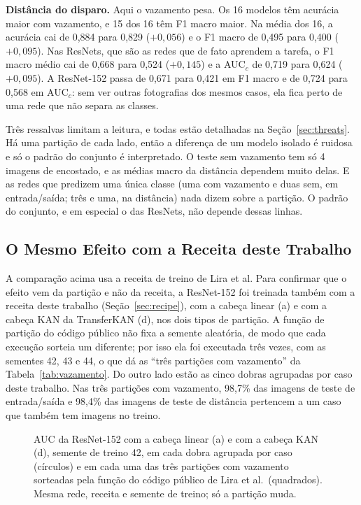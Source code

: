 \textbf{Distância do disparo.} Aqui o vazamento pesa. Os 16 modelos têm acurácia maior com vazamento, e 15 dos 16 têm F1 macro maior. Na média dos 16, a acurácia cai de 0,884 para 0,829 ($+0{,}056$) e o F1 macro de 0,495 para 0,400 ($+0{,}095$). Nas ResNets, que são as redes que de fato aprendem a tarefa, o F1 macro médio cai de 0,668 para 0,524 ($+0{,}145$) e a AUC$_c$ de 0,719 para 0,624 ($+0{,}095$). A ResNet-152 passa de 0,671 para 0,421 em F1 macro e de 0,724 para 0,568 em AUC$_c$: sem ver outras fotografias dos mesmos casos, ela fica perto de uma rede que não separa as classes.



Três ressalvas limitam a leitura, e todas estão detalhadas na Seção~\ref{sec:threats}. Há uma partição de cada lado, então a diferença de um modelo isolado é ruidosa e só o padrão do conjunto é interpretado. O teste sem vazamento tem só 4 imagens de encostado, e as médias macro da distância dependem muito delas. E as redes que predizem uma única classe (uma com vazamento e duas sem, em entrada/saída; três e uma, na distância) nada dizem sobre a partição. O padrão do conjunto, e em especial o das ResNets, não depende dessas linhas.

\subsection{O Mesmo Efeito com a Receita deste Trabalho}
\label{sec:res_leak}

A comparação acima usa a receita de treino de Lira et al. Para confirmar que o efeito vem da partição e não da receita, a ResNet-152 foi treinada também com a receita deste trabalho (Seção~\ref{sec:recipe}), com a cabeça linear (a) e com a cabeça KAN da TransferKAN (d), nos dois tipos de partição. A função de partição do código público não fixa a semente aleatória, de modo que cada execução sorteia um  diferente; por isso ela foi executada três vezes, com as sementes 42, 43 e 44, o que dá as ``três partições com vazamento'' da Tabela~\ref{tab:vazamento}. Do outro lado estão as cinco dobras agrupadas por caso deste trabalho. Nas três partições com vazamento, 98,7\% das imagens de teste de entrada/saída e 98,4\% das imagens de teste de distância pertencem a um caso que também tem imagens no treino.



\begin{figure}[!htbp]
\centering

\caption{AUC da ResNet-152 com a cabeça linear (a) e com a cabeça KAN (d), semente de treino 42, em cada dobra agrupada por caso (círculos) e em cada uma das três partições com vazamento sorteadas pela função do código público de Lira et al.\ (quadrados). Mesma rede, receita e semente de treino; só a partição muda.}
\label{fig:vazamento}
\end{figure}


